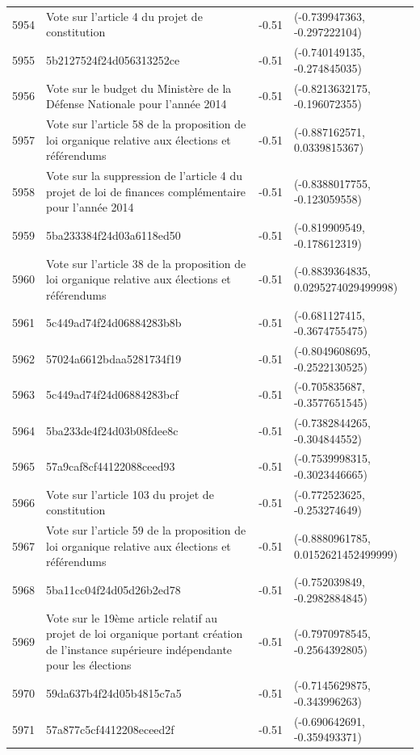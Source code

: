 \begin{table}[ht]
\begin{tabular}{rlrl}
  5954 & Vote sur l'article 4 du projet de constitution & -0.51 & (-0.739947363, -0.297222104) \\ 
  5955 & 5b2127524f24d056313252ce & -0.51 & (-0.740149135, -0.274845035) \\ 
  5956 & Vote sur le budget du Ministère de la Défense Nationale pour l'année 2014 & -0.51 & (-0.8213632175, -0.196072355) \\ 
  5957 & Vote sur l'article 58 de la proposition de loi organique relative aux élections et référendums & -0.51 & (-0.887162571, 0.0339815367) \\ 
  5958 & Vote sur la suppression de l'article 4 du projet de loi de finances complémentaire pour l'année 2014 & -0.51 & (-0.8388017755, -0.123059558) \\ 
  5959 & 5ba233384f24d03a6118ed50 & -0.51 & (-0.819909549, -0.178612319) \\ 
  5960 & Vote sur l'article 38 de la proposition de loi organique relative aux élections et référendums & -0.51 & (-0.8839364835, 0.0295274029499998) \\ 
  5961 & 5c449ad74f24d06884283b8b & -0.51 & (-0.681127415, -0.3674755475) \\ 
  5962 & 57024a6612bdaa5281734f19 & -0.51 & (-0.8049608695, -0.2522130525) \\ 
  5963 & 5c449ad74f24d06884283bcf & -0.51 & (-0.705835687, -0.3577651545) \\ 
  5964 & 5ba233de4f24d03b08fdee8c & -0.51 & (-0.7382844265, -0.304844552) \\ 
  5965 & 57a9caf8cf44122088ceed93 & -0.51 & (-0.7539998315, -0.3023446665) \\ 
  5966 & Vote sur l'article 103 du projet de constitution & -0.51 & (-0.772523625, -0.253274649) \\ 
  5967 & Vote sur l'article 59 de la proposition de loi organique relative aux élections et référendums & -0.51 & (-0.8880961785, 0.0152621452499999) \\ 
  5968 & 5ba11cc04f24d05d26b2ed78 & -0.51 & (-0.752039849, -0.2982884845) \\ 
  5969 & Vote sur le 19ème article relatif au projet de loi organique portant création de l'instance supérieure indépendante pour les élections & -0.51 & (-0.7970978545, -0.2564392805) \\ 
  5970 & 59da637b4f24d05b4815c7a5 & -0.51 & (-0.7145629875, -0.343996263) \\ 
  5971 & 57a877c5cf4412208eceed2f & -0.51 & (-0.690642691, -0.359493371) \\ 

\end{tabular}
\end{table}
